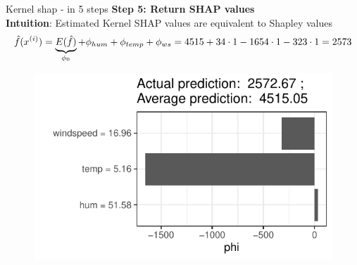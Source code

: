 \documentclass[11pt,compress,t,notes=noshow, aspectratio=169, xcolor=table]{beamer}
\begin{document}
\begin{vbframe}{Kernel shap - in 5 steps}
\textbf{Step 5: Return SHAP values}\\\medskip
\textbf{Intuition}: Estimated Kernel SHAP values are equivalent to Shapley values 
$$
\fh(x^{(i)}) = \underbrace{E(\fh)}_{\phi_0} + \phi_{hum} + \phi_{temp} + \phi_{ws} = 4515 + 34 \cdot 1 - 1654 \cdot 1 - 323 \cdot 1 = 2573
$$

\begin{figure}
    \centering
    \includegraphics[width=0.5\columnwidth]{figure/shapley2shap.pdf}
\end{figure}






  
\end{vbframe}

\end{document}

